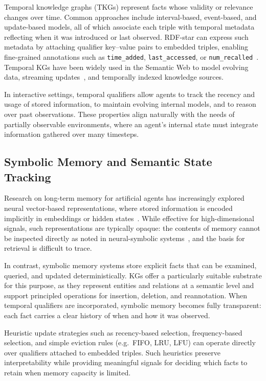 \documentclass[runningheads]{llncs}
\begin{document}
Temporal knowledge graphs (TKGs) represent facts whose validity or
relevance changes over time. Common approaches include interval-based,
event-based, and update-based models, all of which associate each
triple with temporal metadata reflecting when it was introduced or last
observed. RDF-star can express such metadata by attaching qualifier
key–value pairs to embedded triples, enabling fine-grained annotations
such as \texttt{time\_added}, \texttt{last\_accessed}, or
\texttt{num\_recalled}~\cite{moreau2012prov}. Temporal KGs have been widely used in the
Semantic Web to model evolving data, streaming updates~\cite{dellaglio2017streamreasoning}, and temporally
indexed knowledge sources.

In interactive settings, temporal qualifiers allow agents to track the
recency and usage of stored information, to maintain evolving internal
models, and to reason over past observations. These properties align
naturally with the needs of partially observable environments, where an
agent’s internal state must integrate information gathered over many
timesteps.

\subsection{Symbolic Memory and Semantic State Tracking}

Research on long-term memory for artificial agents has increasingly
explored neural vector-based representations, where stored information
is encoded implicitly in embeddings or hidden states~\cite{graves2014neural,graves2016hybrid,Wayne2018MERLIN,DBLP:journals/corr/abs-1803-10122,pritzel2017neuralepisodiccontrol,blundell2016modelfreeepisodiccontrol}. While effective for high-dimensional signals, such representations are typically opaque:
the contents of memory cannot be inspected directly as noted in neural-symbolic systems~\cite{besold2017neuralsymboliclearningreasoningsurvey}, and the basis for
retrieval is difficult to trace.

In contrast, symbolic memory systems store explicit facts that can be
examined, queried, and updated deterministically. KGs offer
a particularly suitable substrate for this purpose, as they represent
entities and relations at a semantic level and support principled
operations for insertion, deletion, and reannotation. When temporal
qualifiers are incorporated, symbolic memory becomes fully transparent:
each fact carries a clear history of when and how it was observed.

Heuristic update strategies such as recency-based selection,
frequency-based selection, and simple eviction rules (e.g.~FIFO, LRU,
LFU) can operate directly over qualifiers attached to embedded triples.
Such heuristics preserve interpretability while providing meaningful
signals for deciding which facts to retain when memory capacity is
limited.
\end{document}
